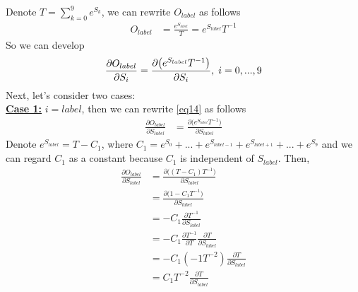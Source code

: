 \documentclass[a4paper,12pt]{article}
\begin{document}
Denote $T = \sum\limits_{k=0}^{9}e^{S_{k}}$, we can rewrite $O_{label}$ as follows
\begin{equation}
\begin{aligned}
O_{label} &= \frac{e^{S_{label}}}{T} = e^{S_{label}}T^{-1} \label{eq13}
\end{aligned}
\end{equation}
So we can develop
\begin{equation}
\begin{aligned}
\frac{\partial{O_{label}}}{\partial{S_i}} &= \frac{\partial{\big(e^{S_{label}}T^{-1}\big)}}{\partial{S_i}}, \thickspace i = 0, ..., 9\\ \label{eq14}
\end{aligned}
\end{equation}
Next, let's consider two cases:\\[0.5cm]
\textbf{\underline{Case 1:}} $i = label$, then we can rewrite \eqref{eq14} as follows
\begin{equation}
\begin{aligned}
\frac{\partial{O_{label}}}{\partial{S_{label}}} &= \frac{\partial{\big(e^{S_{label}}T^{-1}\big)}}{\partial{S_{label}}} \label{eq15}
\end{aligned}
\end{equation}
Denote $e^{S_{label}} = T - C_1$, where $C_1 = e^{S_0} + ... + e^{S_{label - 1}} + e^{S_{label + 1}} + ... + e^{S_{9}}$ and we can regard $C_1$ as a constant because $C_1$ is independent of $S_{label}$. Then,
\begin{equation}
\begin{aligned}
\frac{\partial{O_{label}}}{\partial{S_{label}}} &= \frac{\partial{\big((T - C_1)T^{-1}\big)}}{\partial{S_{label}}} \\
                                                &= \frac{\partial{\big(1 - C_1T^{-1}\big)}}{\partial{S_{label}}} \\
                                                &= -C_1\frac{\partial{T^{-1}}}{\partial{S_{label}}} \\
                                                &= -C_1\frac{\partial{T^{-1}}}{\partial{T}}\frac{\partial{T}}{\partial{S_{label}}} \\
                                                &= -C_1(-1T^{-2})\frac{\partial{T}}{\partial{S_{label}}} \\
                                                &= C_1T^{-2}\frac{\partial{T}}{\partial{S_{label}}} \label{eq16}
\end{aligned}
\end{equation}
\end{document}
